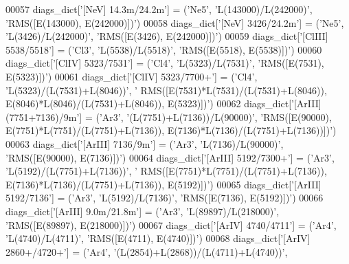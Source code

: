 \begin{DoxyCode}
00057 diags\_dict[\textcolor{stringliteral}{'[NeV] 14.3m/24.2m'}] = (\textcolor{stringliteral}{'Ne5'}, \textcolor{stringliteral}{'L(143000)/L(242000)'}, \textcolor{stringliteral}{'RMS([E(143000), E(242000)])'})
00058 diags\_dict[\textcolor{stringliteral}{'[NeV] 3426/24.2m'}] = (\textcolor{stringliteral}{'Ne5'}, \textcolor{stringliteral}{'L(3426)/L(242000)'}, \textcolor{stringliteral}{'RMS([E(3426), E(242000)])'})
00059 diags\_dict[\textcolor{stringliteral}{'[ClIII] 5538/5518'}] = (\textcolor{stringliteral}{'Cl3'}, \textcolor{stringliteral}{'L(5538)/L(5518)'}, \textcolor{stringliteral}{'RMS([E(5518), E(5538)])'})
00060 diags\_dict[\textcolor{stringliteral}{'[ClIV] 5323/7531'}] = (\textcolor{stringliteral}{'Cl4'}, \textcolor{stringliteral}{'L(5323)/L(7531)'}, \textcolor{stringliteral}{'RMS([E(7531), E(5323)])'})
00061 diags\_dict[\textcolor{stringliteral}{'[ClIV] 5323/7700+'}] = (\textcolor{stringliteral}{'Cl4'}, \textcolor{stringliteral}{'L(5323)/(L(7531)+L(8046))'}, \textcolor{stringliteral}{'
      RMS([E(7531)*L(7531)/(L(7531)+L(8046)), E(8046)*L(8046)/(L(7531)+L(8046)), E(5323)])'})
00062 diags\_dict[\textcolor{stringliteral}{'[ArIII] (7751+7136)/9m'}] = (\textcolor{stringliteral}{'Ar3'}, \textcolor{stringliteral}{'(L(7751)+L(7136))/L(90000)'}, \textcolor{stringliteral}{'RMS([E(90000),
       E(7751)*L(7751)/(L(7751)+L(7136)), E(7136)*L(7136)/(L(7751)+L(7136))])'})
00063 diags\_dict[\textcolor{stringliteral}{'[ArIII] 7136/9m'}] = (\textcolor{stringliteral}{'Ar3'}, \textcolor{stringliteral}{'L(7136)/L(90000)'}, \textcolor{stringliteral}{'RMS([E(90000), E(7136)])'})
00064 diags\_dict[\textcolor{stringliteral}{'[ArIII] 5192/7300+'}] = (\textcolor{stringliteral}{'Ar3'}, \textcolor{stringliteral}{'L(5192)/(L(7751)+L(7136))'}, \textcolor{stringliteral}{'
      RMS([E(7751)*L(7751)/(L(7751)+L(7136)), E(7136)*L(7136)/(L(7751)+L(7136)), E(5192)])'})
00065 diags\_dict[\textcolor{stringliteral}{'[ArIII] 5192/7136'}] = (\textcolor{stringliteral}{'Ar3'}, \textcolor{stringliteral}{'L(5192)/L(7136)'}, \textcolor{stringliteral}{'RMS([E(7136), E(5192)])'})
00066 diags\_dict[\textcolor{stringliteral}{'[ArIII] 9.0m/21.8m'}] = (\textcolor{stringliteral}{'Ar3'}, \textcolor{stringliteral}{'L(89897)/L(218000)'}, \textcolor{stringliteral}{'RMS([E(89897), E(218000)])'})
00067 diags\_dict[\textcolor{stringliteral}{'[ArIV] 4740/4711'}] = (\textcolor{stringliteral}{'Ar4'}, \textcolor{stringliteral}{'L(4740)/L(4711)'}, \textcolor{stringliteral}{'RMS([E(4711), E(4740)])'})
00068 diags\_dict[\textcolor{stringliteral}{'[ArIV] 2860+/4720+'}] = (\textcolor{stringliteral}{'Ar4'}, \textcolor{stringliteral}{'(L(2854)+L(2868))/(L(4711)+L(4740))'},

\end{DoxyCode}
